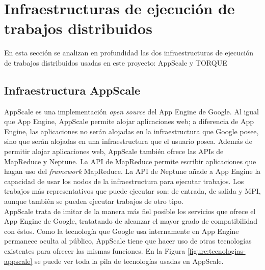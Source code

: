\section{Infraestructuras de ejecución de trabajos distribuidos}

En esta sección se analizan en profundidad las dos infraestructuras de ejecución de trabajos distribuidos usadas en este proyecto: AppScale y TORQUE


\subsection{Infraestructura AppScale}

AppScale es una implementación \emph{open source} del App Engine de Google. Al igual que App Engine, AppScale permite alojar aplicaciones web; a diferencia de App Engine, las aplicaciones no serán alojadas en la infraestructura que Google posee, sino que serán alojadas en una infraestructura que el usuario posea. Además de permitir alojar aplicaciones web, AppScale también ofrece las APIs de MapReduce y Neptune. La API de MapReduce permite escribir aplicaciones que hagan uso del \emph{framework} MapReduce. La API de Neptune añade a App Engine la capacidad de usar los nodos de la infraestructura para ejecutar trabajos. Los trabajos más representativos que puede ejecutar son: de entrada, de salida y MPI, aunque también se pueden ejecutar trabajos de otro tipo. \\

AppScale trata de imitar de la manera más fiel posible los servicios que ofrece el App Engine de Google, tratatando de alcanzar el mayor grado de compatibilidad con éstos. Como la tecnología que Google usa internamente en App Engine permanece oculta al público, AppScale tiene que hacer uso de otras tecnologías existentes para ofrecer las mismas funciones. En la Figura \ref{figure:tecnologias-appscale} se puede ver toda la pila de tecnologías usadas en AppScale.


